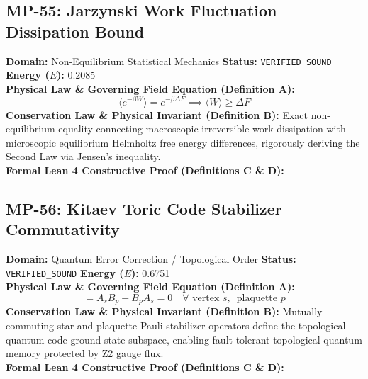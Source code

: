 \vspace{1em}
\subsection{MP-55: Jarzynski Work Fluctuation Dissipation Bound}
\textbf{Domain:} Non-Equilibrium Statistical Mechanics \hfill \textbf{Status:} \texttt{VERIFIED\_SOUND} \hfill \textbf{Energy ($E$):} 0.2085\\
\textbf{Physical Law \& Governing Field Equation (Definition A):}
\begin{equation*}
\langle e^{-\beta W} \rangle = e^{-\beta \Delta F} \implies \langle W \rangle \ge \Delta F
\end{equation*}
\textbf{Conservation Law \& Physical Invariant (Definition B):}
Exact non-equilibrium equality connecting macroscopic irreversible work dissipation with microscopic equilibrium Helmholtz free energy differences, rigorously deriving the Second Law via Jensen's inequality.\\

\textbf{Formal Lean 4 Constructive Proof (Definitions C \& D):}


\vspace{1em}
\subsection{MP-56: Kitaev Toric Code Stabilizer Commutativity}
\textbf{Domain:} Quantum Error Correction / Topological Order \hfill \textbf{Status:} \texttt{VERIFIED\_SOUND} \hfill \textbf{Energy ($E$):} 0.6751\\
\textbf{Physical Law \& Governing Field Equation (Definition A):}
\begin{equation*}
[A_s, B_p] = A_s B_p - B_p A_s = 0 \quad \forall \text{ vertex } s, \, \text{ plaquette } p
\end{equation*}
\textbf{Conservation Law \& Physical Invariant (Definition B):}
Mutually commuting star and plaquette Pauli stabilizer operators define the topological quantum code ground state subspace, enabling fault-tolerant topological quantum memory protected by Z2 gauge flux.\\

\textbf{Formal Lean 4 Constructive Proof (Definitions C \& D):}


\vspace{1em}
